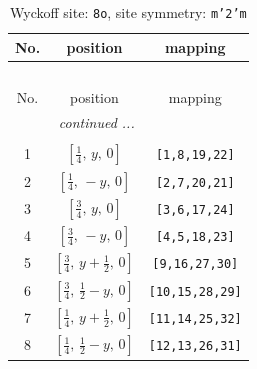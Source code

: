 \documentclass[fleqn,8pt]{jsarticle}
\begin{document}
\begin{longtable}{ccc}
\caption{Wyckoff site: {\tt 8o}, site symmetry: {\tt m'2'm}}
 \\
 \hline \hline
No. & position & mapping \\ \hline \endfirsthead

\multicolumn{2}{l}{\tablename\ \thetable{}} \\
 \hline \hline
No. & position & mapping \\ \hline \endhead

 \hline \hline
\multicolumn{2}{r}{\footnotesize\it continued ...} \\ \endfoot

 \hline \hline
\multicolumn{2}{r}{} \\ \endlastfoot

1 & $\left[ \frac{1}{4},\, y,\, 0 \right]$ & {\tt [1,8,19,22]} \\ \hline
2 & $\left[ \frac{1}{4},\, - y,\, 0 \right]$ & {\tt [2,7,20,21]} \\ \hline
3 & $\left[ \frac{3}{4},\, y,\, 0 \right]$ & {\tt [3,6,17,24]} \\ \hline
4 & $\left[ \frac{3}{4},\, - y,\, 0 \right]$ & {\tt [4,5,18,23]} \\ \hline
5 & $\left[ \frac{3}{4},\, y + \frac{1}{2},\, 0 \right]$ & {\tt [9,16,27,30]} \\ \hline
6 & $\left[ \frac{3}{4},\, \frac{1}{2} - y,\, 0 \right]$ & {\tt [10,15,28,29]} \\ \hline
7 & $\left[ \frac{1}{4},\, y + \frac{1}{2},\, 0 \right]$ & {\tt [11,14,25,32]} \\ \hline
8 & $\left[ \frac{1}{4},\, \frac{1}{2} - y,\, 0 \right]$ & {\tt [12,13,26,31]} \\
\end{longtable}
\renewcommand{\arraystretch}{1.2}
\end{document}
